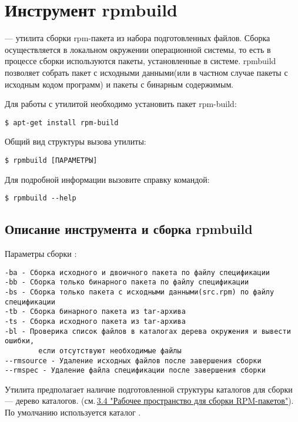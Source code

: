 \hypertarget{rpmbuild}{\chapter{Инструмент rpmbuild}}\label{chapter-rpmbuild}


 --- утилита сборки rpm-пакета из набора подготовленных файлов. Сборка осуществляется
в локальном окружении операционной системы, то есть в процессе сборки используются пакеты,
установленные в системе. rpmbuild позволяет собрать пакет с исходными данными(или в частном
случае пакеты с исходным кодом программ) и пакеты с бинарным содержимым.

Для работы с утилитой необходимо установить пакет rpm-build:

\begin{verbatim}
$ apt-get install rpm-build
\end{verbatim}

Общий вид структуры вызова утилиты:

\begin{verbatim}
$ rpmbuild [ПАРАМЕТРЫ]
\end{verbatim}

Для подробной информации вызовите справку командой:

\begin{verbatim}
$ rpmbuild --help
\end{verbatim}

\section{Описание инструмента и сборка rpmbuild}

Параметры сборки :
\begin{verbatim}
-ba - Сборка исходного и двоичного пакета по файлу спецификации
-bb - Cборка только бинарного пакета по файлу спецификации
-bs - Cборка только пакета c исходными данными(src.rpm) по файлу спецификации
-tb - Сборка бинарного пакета из tar-архива
-ts - Сборка исходного пакета из tar-архива
-bl - Проверика список файлов в каталогах дерева окружения и вывести ошибки,
        если отсутствуют необходимые файлы
--rmsource - Удаление исходных файлов после завершения сборки
--rmspec - Удаление файла спецификации после завершения сборки
\end{verbatim}

Утилита предполагает наличие подготовленной структуры каталогов для сборки --- дерево каталогов.
(см.\,\hyperlink{3.4}{3.4 "Рабочее пространство для сборки RPM-пакетов"}). По умолчанию используется
каталог .


